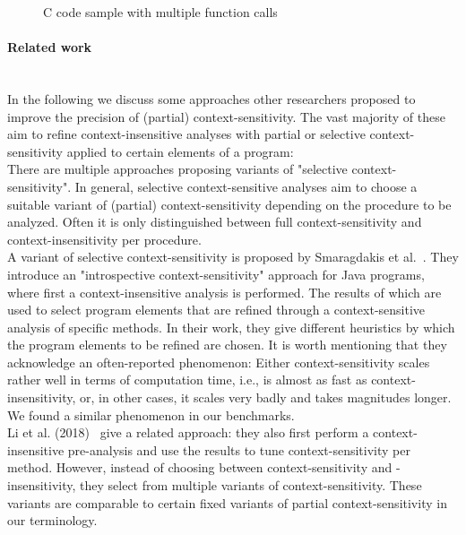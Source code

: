   \begin{figure}
    \centering
    \begin{subfigure}{0.35\textwidth}
      \centering
      
    \end{subfigure}
    \caption{C code sample with multiple function calls}
    \label{fig:exampleIntro}
  \end{figure}


\paragraph{Related work}\mbox{}\\
In the following we discuss some approaches other researchers proposed to improve the precision of (partial) context-sensitivity. The vast majority of these aim to refine context-insensitive analyses with partial or selective context-sensitivity applied to certain elements of a program:\\
There are multiple approaches proposing variants of "selective context-sensitivity". In general, selective context-sensitive analyses aim to choose a suitable variant of (partial) context-sensitivity depending on the procedure to be analyzed. Often it is only distinguished between full context-sensitivity and context-insensitivity per procedure.\\
A variant of selective context-sensitivity is proposed by Smaragdakis et al.~\parencite{smaragdakis2014introspective}. They introduce an "introspective context-sensitivity" approach for Java programs, where first a context-insensitive analysis is performed. The results of which are used to select program elements that are refined through a context-sensitive analysis of specific methods. In their work, they give different heuristics by which the program elements to be refined are chosen. It is worth mentioning that they acknowledge an often-reported phenomenon: Either context-sensitivity scales rather well in terms of computation time, i.e., is almost as fast as context-insensitivity, or, in other cases, it scales very badly and takes magnitudes longer. We found a similar phenomenon in our benchmarks.\\
Li et al. (2018)~\parencite{li2018scalability} give a related approach: they also first perform a context-insensitive pre-analysis and use the results to tune context-sensitivity per method. However, instead of choosing between context-sensitivity and -insensitivity, they select from multiple variants of context-sensitivity. These variants are comparable to certain fixed variants of partial context-sensitivity in our terminology.\\

